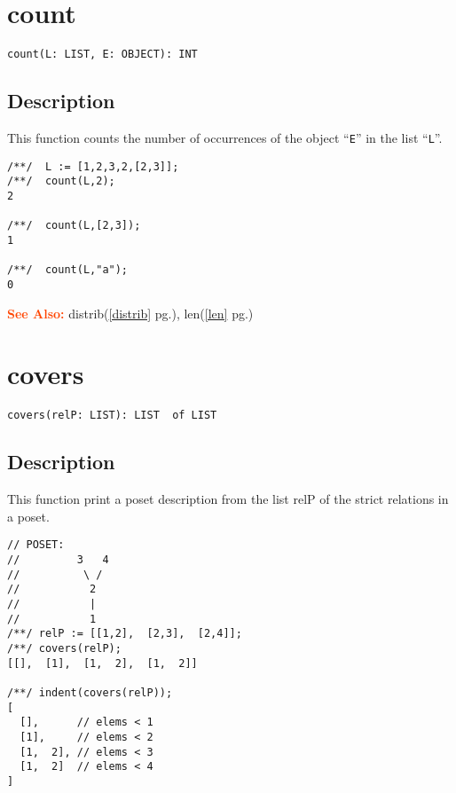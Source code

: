 \documentclass[a4paper]{mybook}
\newenvironment{command}{}{} %
\newcommand\SeeAlso{\par\textcolor{OrangeRed}{\textbf{\large See Also: }}}
\begin{document}
\section{count}
\label{count}
\begin{command} %


\begin{Verbatim}[label=syntax, rulecolor=\color{MidnightBlue},
frame=single]
count(L: LIST, E: OBJECT): INT
\end{Verbatim}


\subsection*{Description}

This function counts the number of occurrences of the object ``\verb&E&'' in the
list ``\verb&L&''.
\begin{Verbatim}[label=example, rulecolor=\color{PineGreen}, frame=single]
/**/  L := [1,2,3,2,[2,3]];
/**/  count(L,2);
2

/**/  count(L,[2,3]);
1

/**/  count(L,"a");
0
\end{Verbatim}


\SeeAlso %
  distrib(\ref{distrib} pg.\pageref{distrib}), 
    len(\ref{len} pg.\pageref{len})
\end{command} %

\section{covers}
\label{covers}
\begin{command} %


\begin{Verbatim}[label=syntax, rulecolor=\color{MidnightBlue},
frame=single]
covers(relP: LIST): LIST  of LIST
\end{Verbatim}


\subsection*{Description}

This function print a poset description from the list relP of the strict relations in a poset.
\begin{Verbatim}[label=example, rulecolor=\color{PineGreen}, frame=single]
// POSET:
//         3   4
//          \ /
//           2
//           |
//           1
/**/ relP := [[1,2],  [2,3],  [2,4]];
/**/ covers(relP);
[[],  [1],  [1,  2],  [1,  2]]

/**/ indent(covers(relP));
[
  [],      // elems < 1
  [1],     // elems < 2
  [1,  2], // elems < 3
  [1,  2]  // elems < 4
]
\end{Verbatim}


\end{command} %
\end{document}
